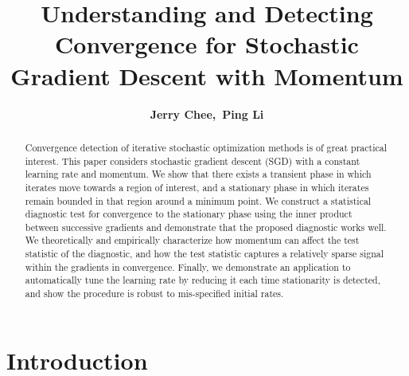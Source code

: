 \documentclass[conference]{IEEEtran}
\begin{document}
\title{Understanding and Detecting Convergence for Stochastic Gradient Descent with Momentum}

\author{\IEEEauthorblockN
{\bf Jerry Chee,\  Ping Li\vspace{0.08in}}
}



\maketitle

\begin{abstract}
 Convergence  detection of iterative stochastic optimization methods is of great practical interest.
This paper considers stochastic gradient descent (SGD) with a constant learning rate and momentum. We show that there exists a transient phase in which iterates move towards a region of interest, and a stationary phase in which iterates remain bounded in that region around a minimum point.
We construct a statistical diagnostic test for convergence to the stationary phase using the inner product between successive gradients and demonstrate that the proposed diagnostic works well. We theoretically and empirically characterize how momentum can affect the test statistic of the diagnostic, and how the test statistic captures a relatively sparse signal within the gradients in convergence.
Finally, we demonstrate an application to automatically tune the learning rate by reducing it each time stationarity is detected, and show the procedure is robust to mis-specified initial rates.

\vspace{0.1in}

\end{abstract}




\section{Introduction}
\end{document}
